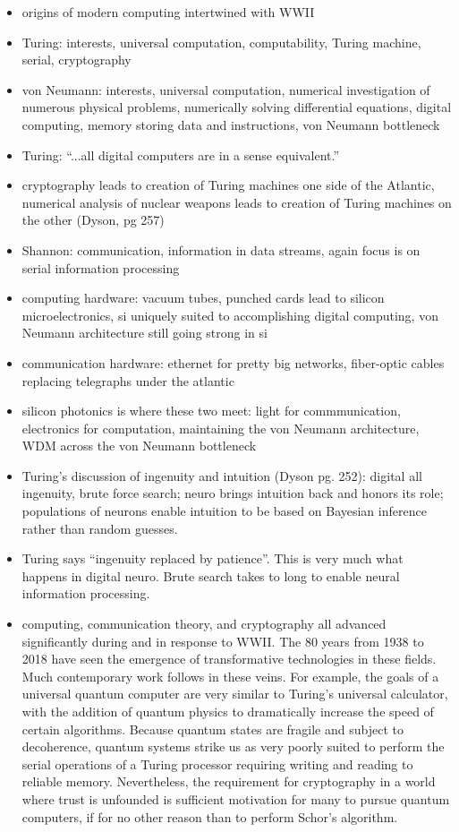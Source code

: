 \vspace{4em}
\begin{itemize}
\item origins of modern computing intertwined with WWII
\item Turing: interests, universal computation, computability, Turing machine, serial, cryptography
\item von Neumann: interests, universal computation, numerical investigation of numerous physical problems, numerically solving differential equations, digital computing, memory storing data and instructions, von Neumann bottleneck
\item Turing: ``...all digital computers are in a sense equivalent.'' \cite{tu1950}
\item cryptography leads to creation of Turing machines one side of the Atlantic, numerical analysis of nuclear weapons leads to creation of Turing machines on the other (Dyson, pg 257)
\item Shannon: communication, information in data streams, again focus is on serial information processing
\item computing hardware: vacuum tubes, punched cards lead to silicon microelectronics, si uniquely suited to accomplishing digital computing, von Neumann architecture still going strong in si
\item communication hardware: ethernet for pretty big networks, fiber-optic cables replacing telegraphs under the atlantic
\item silicon photonics is where these two meet: light for commmunication, electronics for computation, maintaining the von Neumann architecture, WDM across the von Neumann bottleneck
\item Turing's discussion of ingenuity and intuition (Dyson pg. 252): digital all ingenuity, brute force search; neuro brings intuition back and honors its role; populations of neurons enable intuition to be based on Bayesian inference rather than random guesses.
\item Turing says ``ingenuity replaced by patience''. This is very much what happens in digital neuro. Brute search takes to long to enable neural information processing.
\item computing, communication theory, and cryptography all advanced significantly during and in response to WWII. The 80 years from 1938 to 2018 have seen the emergence of transformative technologies in these fields. Much contemporary work follows in these veins. For example, the goals of a universal quantum computer are very similar to Turing's universal calculator, with the addition of quantum physics to dramatically increase the speed of certain algorithms. Because quantum states are fragile and subject to decoherence, quantum systems strike us as very poorly suited to perform the serial operations of a Turing processor requiring writing and reading to reliable memory. Nevertheless, the requirement for cryptography in a world where trust is unfounded is sufficient motivation for many to pursue quantum computers, if for no other reason than to perform Schor's algorithm.

\end{itemize}
